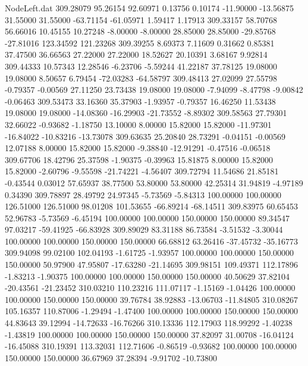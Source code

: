\begin{filecontents}{NodeLeft.dat}
 309.28079   95.26154   92.60971     0.13756    0.10174  -11.90000  -13.56875   31.55000   31.55000  -63.71154  -61.05971    1.59417    1.17913
 309.33157   58.70768   56.66016    10.45155   10.27248   -8.00000   -8.00000   28.85000   28.85000  -29.85768  -27.81016  123.34592  121.23268
 309.39255    8.69373    7.11609     0.31662    0.85381   37.47500   36.66563   27.22000   27.22000   18.52627   20.10391    3.68167    9.92814
 309.44333   10.57343   12.28546    -6.23706   -5.59244   41.22187   37.78125   19.08000   19.08000    8.50657    6.79454  -72.03283  -64.58797
 309.48413   27.02099   27.55798    -0.79357   -0.00569   27.11250   23.73438   19.08000   19.08000   -7.94099   -8.47798   -9.00842   -0.06463
 309.53473   33.16360   35.37903    -1.93957   -0.79357   16.46250   11.53438   19.08000   19.08000  -14.08360  -16.29903  -21.73552   -8.89302
 309.58563   27.79301   32.66022    -0.93682   -1.18750   13.10000    8.00000   15.82000   15.82000  -11.97301  -16.84022  -10.83216  -13.73078
 309.63635   25.20840   28.73291    -0.04151   -0.00569   12.07188    8.00000   15.82000   15.82000   -9.38840  -12.91291   -0.47516   -0.06518
 309.67706   18.42796   25.37598    -1.90375   -0.39963   15.81875    8.00000   15.82000   15.82000   -2.60796   -9.55598  -21.74221   -4.56407
 309.72794   11.54686   21.85181    -0.43544    0.03012   57.65937   38.77500   53.80000   53.80000   42.25314   31.94819   -4.97189    0.34390
 309.78897   28.49792   24.97345    -5.73569   -5.84313  100.00000  100.00000  126.51000  126.51000   98.01208  101.53655  -66.89214  -68.14511
 309.83975   60.65453   52.96783    -5.73569   -6.45194  100.00000  100.00000  150.00000  150.00000   89.34547   97.03217  -59.41925  -66.83928
 309.89029   83.31188   86.73584    -3.51532   -3.30044  100.00000  100.00000  150.00000  150.00000   66.68812   63.26416  -37.45732  -35.16773
 309.94098   99.02100  102.04193    -1.61725   -1.93957  100.00000  100.00000  150.00000  150.00000   50.97900   47.95807  -17.63280  -21.14695
 309.98151  109.49371  112.17896    -1.83213   -1.90375  100.00000  100.00000  150.00000  150.00000   40.50629   37.82104  -20.43561  -21.23452
 310.03210  110.23216  111.07117    -1.15169   -1.04426  100.00000  100.00000  150.00000  150.00000   39.76784   38.92883  -13.06703  -11.84805
 310.08267  105.16357  110.87006    -1.29494   -1.47400  100.00000  100.00000  150.00000  150.00000   44.83643   39.12994  -14.72633  -16.76266
 310.13336  112.17903  118.99292    -1.40238   -1.43819  100.00000  100.00000  150.00000  150.00000   37.82097   31.00708  -16.04124  -16.45088
 310.19391  113.32031  112.71606    -0.86519   -0.93682  100.00000  100.00000  150.00000  150.00000   36.67969   37.28394   -9.91702  -10.73800

\end{filecontents}
